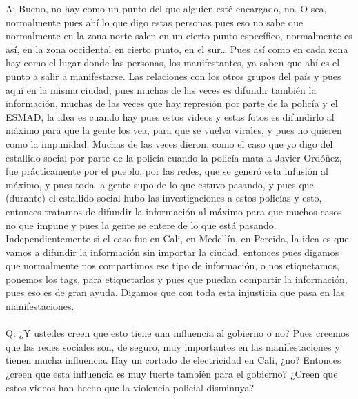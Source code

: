 \documentclass{phyasgn}\usepackage{nag}
\begin{document}
A: Bueno, no hay como un punto del que alguien esté encargado, no. O sea, normalmente pues ahí lo que digo estas personas pues eso no sabe que normalmente en la zona norte salen en un cierto punto específico, normalmente es así, en la zona occidental en cierto punto, en el sur… Pues así como en cada zona hay como el lugar donde las personas, los manifestantes, ya saben que ahí es el punto a salir a manifestarse. Las relaciones con los otros grupos del país y pues aquí en la misma ciudad, pues muchas de las veces es difundir también la información, muchas de las veces que hay represión por parte de la policía y el ESMAD, la idea es cuando hay pues estos videos y estas fotos es difundirlo al máximo para que la gente los vea, para que se vuelva virales, y pues no quieren como la impunidad. Muchas de las veces dieron, como el caso que yo digo del estallido social por parte de la policía cuando la policía mata a Javier Ordóñez, fue prácticamente por el pueblo, por las redes, que se generó esta infusión al máximo, y pues toda la gente supo de lo que estuvo pasando, y pues que (durante) el estallido social hubo las investigaciones a estos policías y esto, entonces tratamos de difundir la información al máximo para que muchos casos no que impune y pues la gente se entere de lo que está pasando. Independientemente si el caso fue en Cali, en Medellín, en Pereida, la idea es que vamos a difundir la información sin importar la ciudad, entonces pues digamos que normalmente nos compartimos ese tipo de información, o nos etiquetamos, ponemos los tags, para etiquetarlos y pues que puedan compartir la información, pues eso es de gran ayuda. Digamos que con toda esta injusticia que pasa en las manifestaciones. \\
\\
Q: ¿Y ustedes creen que esto tiene una influencia al gobierno o no? Pues creemos que las redes sociales son, de seguro, muy importantes en las manifestaciones y tienen mucha influencia. Hay un cortado de electricidad en Cali, ¿no? Entonces ¿creen que esta influencia es muy fuerte también para el gobierno? ¿Creen que estos videos han hecho que la violencia policial disminuya?\\
\end{document}
